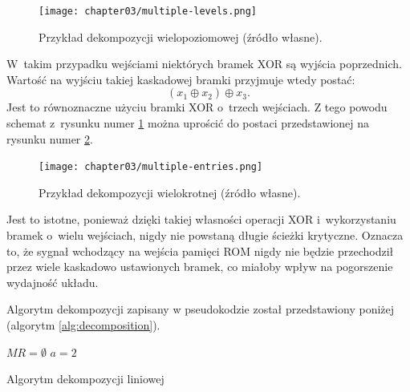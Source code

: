 \begin{figure}[h]
\centering
\texttt{[image: chapter03/multiple-levels.png]}
\caption{Przykład dekompozycji wielopoziomowej (źródło własne).}
\label{fig:multiple-levels}
\end{figure}

W~takim przypadku wejściami niektórych bramek XOR są wyjścia poprzednich.
Wartość na wyjściu takiej kaskadowej bramki przyjmuje wtedy postać:
\begin{equation}
(x_1 \oplus x_2) \oplus x_3.
\end{equation}
Jest to równoznaczne użyciu bramki XOR o~trzech wejściach.
Z tego powodu schemat z~rysunku numer \ref{fig:multiple-levels} można uprościć do postaci przedstawionej na rysunku numer \ref{fig:multiple-entries}.

\begin{figure}[h]
\centering
\texttt{[image: chapter03/multiple-entries.png]}
\caption{Przykład dekompozycji wielokrotnej (źródło własne).}
\label{fig:multiple-entries}
\end{figure}

Jest to istotne,
ponieważ dzięki takiej własności operacji XOR i~wykorzystaniu bramek o~wielu wejściach,
nigdy nie powstaną długie ścieżki krytyczne.
Oznacza to,
że sygnał wchodzący na wejścia pamięci ROM nigdy nie będzie przechodził przez wiele kaskadowo ustawionych bramek,
co miałoby wpływ na pogorszenie wydajność układu.

Algorytm dekompozycji zapisany w pseudokodzie został przedstawiony poniżej (algorytm \ref{alg:decomposition}).

\begin{algorithm}[h]
    $MR=\emptyset$\;
    $a = 2$\;
    \While{$a <= n$}{
        \For{$\forall P \subseteq X : \left\vert{P}\right\vert = a$}{
            \If{$\not\exists w_i \in{MR} : \forall x_j \in{X} : MR[i][j] = 1 \iff x_j \in{P}$}{
                $F = H(XOR(P), X \backslash P)$ \;
                Ponów algorytm dla funkcji $F=H$\;
            }
        }
    }
    \caption{Algorytm dekompozycji liniowej}
    \label{alg:decomposition}
\end{algorithm}
%
%
%
